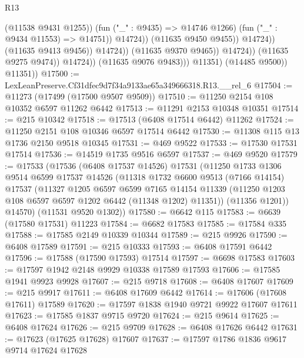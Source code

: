 \begin{lexlean}{R13}
\begin{coremodule}
                                                (@11538 @9431 @1255))
                                              (fun ("_" : @9435) => @14746 @1266)
                                              (fun ("_" : @9434 @11553) => @14751))
                                            @14724))
                                        (@11635 @9450 @9455))
                                      @14724))
                                  (@11635 @9413 @9456))
                                @14724))
                            (@11635 @9370 @9465))
                          @14724))
                      (@11635 @9275 @9474))
                    @14724))
                (@11635 @9076 @9483)))
            @11351)
          (@14485 @9500))
        @11351))
@17500 := LexLeanPreserve.Cf31dfec9d7f34a9133ae65a349666318.R13.__rel_6
@17504 := @11273 (@17499 (@17500 @9507 @9509))
@17510 := @11250 @2154 @108 @10352 @6597 @11262 @6442
@17513 := @11291 @2153 @10348 @10351
@17514 := @215 @10342
@17518 := @17513 (@6408 @17514 @6442) @11262
@17524 := @11250 @2151 @108 @10346 @6597 @17514 @6442
@17530 := @11308 @115 @13 @1736 @2150 @9518 @10345
@17531 := @469 @9522
@17533 := @17530 @17531 @17514
@17536 := @14519 @1735 @9516 @6597
@17537 := @469 @9520
@17579 := @17533
    (@17536
      (@6408 @17537 @14526)
      @17531
      (@11250
        @1733
        @1306
        @9514
        @6599
        @17537
        @14526
        (@11318
          @1732
          @6600
          @9513
          (@7166 @14154)
          @17537
          (@11327
            @1205
            @6597
            @6599
            @7165
            @14154
            @11339
            (@11250 @1203 @108 @6597 @6597 @1202 @6442 (@11348 @1202) @11351))
          (@11356 @1201))
        @14570)
      (@11531 @9520 @1302))
@17580 := @6642 @115
@17583 := @6639 (@17580 @17531) @11223
@17584 := @6682 @17583
@17585 := @17584 @335
@17588 := @17585 @2149 @10339 @10344
@17589 := @215 @9926
@17590 := @6408 @17589
@17591 := @215 @10333
@17593 := @6408 @17591 @6442
@17596 := @17588 (@17590 @17593) @17514
@17597 := @6698 @17583
@17603 := @17597 @1942 @2148 @9929 @10338 @17589 @17593
@17606 := @17585 @1941 @9923 @9928
@17607 := @215 @9718
@17608 := @6408 @17607
@17609 := @215 @9917
@17611 := @6408 @17609 @6442
@17614 := @17606 (@17608 @17611) @17589
@17620 := @17597 @1838 @1940 @9721 @9922 @17607 @17611
@17623 := @17585 @1837 @9715 @9720
@17624 := @215 @9614
@17625 := @6408 @17624
@17626 := @215 @9709
@17628 := @6408 @17626 @6442
@17631 := @17623 (@17625 @17628) @17607
@17637 := @17597 @1786 @1836 @9617 @9714 @17624 @17628

\end{coremodule}
\end{lexlean}
